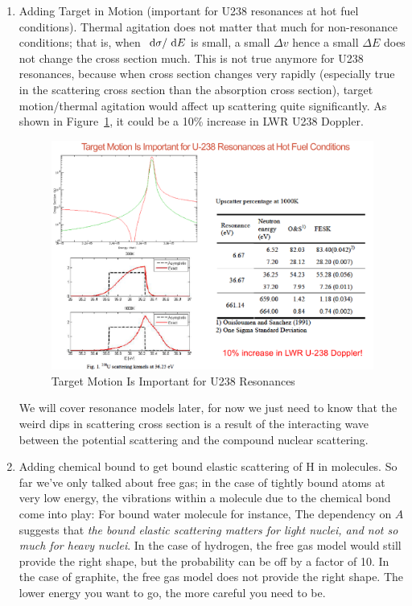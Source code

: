 \documentclass{school-22.211-notes}
\begin{document}
\begin{enumerate}
\item Adding Target in Motion (important for U238 resonances at hot fuel conditions). Thermal agitation does not matter that much for non-resonance conditions; that is, when $\mbox{ }\mathrm{d} \sigma/\mbox{ }\mathrm{d} E$ is small, a small $\Delta v$ hence a small $\Delta E$ does not change the cross section much. This is not true anymore for U238 resonances, because when cross section changes very rapidly (especially true in the scattering cross section than the absorption cross section), target motion/thermal agitation would affect up scattering quite significantly. As shown in Figure~\ref{timr}, it could be a 10\% increase in LWR U238 Doppler.  
\begin{figure}[ht]
  \centering
  \includegraphics[width=6in]{images/sl-d/target-in-motion-resonance.png}
  \caption{Target Motion Is Important for U238 Resonances} \label{timr}
\end{figure}

We will cover resonance models later, for now we just need to know that the weird dips in scattering cross section is a result of the interacting wave between the potential scattering and the compound nuclear scattering. 

\item Adding chemical bound to get bound elastic scattering of H in  molecules. So far we've only talked about free gas; in the case of tightly bound atoms at very low energy, the vibrations within a molecule due to the chemical bond come into play:
  For bound water molecule for instance, 
  The dependency on $A$ suggests that \textit{the bound elastic scattering matters for light nuclei, and not so much for heavy nuclei}. In the case of hydrogen, the free gas model would still provide the right shape, but the probability can be off by a factor of 10. In the case of graphite, the free gas model does not provide the right shape. The lower energy you want to go, the more careful you need to be. 


\end{enumerate}
\end{document}
